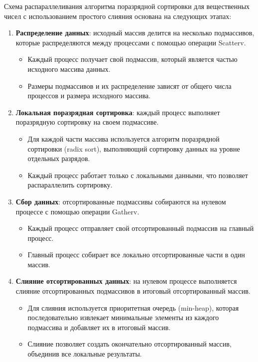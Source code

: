 \documentclass[12pt]{article}
\begin{document}
\hspace*{1.25em}Схема распараллеливания алгоритма поразрядной сортировки для вещественных чисел с использованием простого слияния основана на следующих этапах:
\begin{enumerate}
    \item \textbf{Распределение данных}: исходный массив делится на несколько подмассивов, которые распределяются между процессами с помощью операции Scatterv.
    \begin{itemize}
        \item Каждый процесс получает свой подмассив, который является частью исходного массива данных.
        \item Размеры подмассивов и их распределение зависят от общего числа процессов и размера исходного массива.
    \end{itemize}

    \item \textbf{Локальная поразрядная сортировка}: каждый процесс выполняет поразрядную сортировку на своем подмассиве.
    \begin{itemize}
        \item Для каждой части массива используется алгоритм поразрядной сортировки (radix sort), выполняющий сортировку данных на уровне отдельных разрядов.
        \item Каждый процесс работает только с локальными данными, что позволяет распараллелить сортировку.
    \end{itemize}

    \item \textbf{Сбор данных}: отсортированные подмассивы собираются на нулевом процессе с помощью операции Gatherv.
    \begin{itemize}
        \item Каждый процесс отправляет свой отсортированный подмассив на главный процесс.
        \item Главный процесс собирает все локально отсортированные части в один массив.
    \end{itemize}

    \item \textbf{Слияние отсортированных данных}: на нулевом процессе выполняется слияние отсортированных подмассивов в итоговый отсортированный массив.
    \begin{itemize}
        \item Для слияния используется приоритетная очередь (min-heap), которая последовательно извлекает минимальные элементы из каждого подмассива и добавляет их в итоговый массив.
        \item Слияние позволяет создать окончательно отсортированный массив, объединив все локальные результаты.
    \end{itemize}


\end{enumerate}
\end{document}
